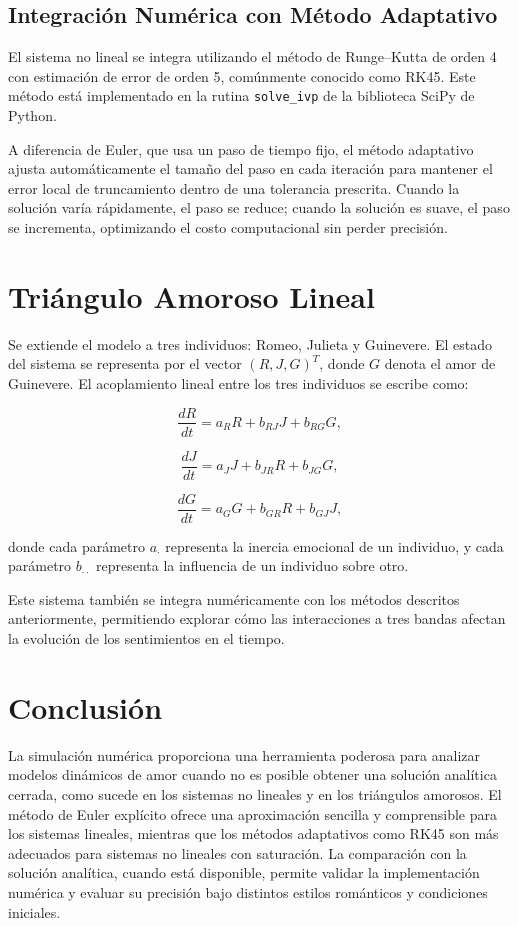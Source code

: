 \documentclass[12pt]{article}
\begin{document}
\subsection{Integración Numérica con Método Adaptativo}

El sistema no lineal se integra utilizando el método de Runge--Kutta de orden 4 con estimación de error de orden 5, comúnmente conocido como RK45. Este método está implementado en la rutina \texttt{solve\_ivp} de la biblioteca SciPy de Python.

A diferencia de Euler, que usa un paso de tiempo fijo, el método adaptativo ajusta automáticamente el tamaño del paso en cada iteración para mantener el error local de truncamiento dentro de una tolerancia prescrita. Cuando la solución varía rápidamente, el paso se reduce; cuando la solución es suave, el paso se incrementa, optimizando el costo computacional sin perder precisión.

\section{Triángulo Amoroso Lineal}

Se extiende el modelo a tres individuos: Romeo, Julieta y Guinevere. El estado del sistema se representa por el vector $(R, J, G)^T$, donde $G$ denota el amor de Guinevere. El acoplamiento lineal entre los tres individuos se escribe como:

\begin{equation}
\frac{dR}{dt} = a_R R + b_{RJ} J + b_{RG} G,
\end{equation}

\begin{equation}
\frac{dJ}{dt} = a_J J + b_{JR} R + b_{JG} G,
\end{equation}

\begin{equation}
\frac{dG}{dt} = a_G G + b_{GR} R + b_{GJ} J,
\end{equation}

donde cada parámetro $a_\cdot$ representa la inercia emocional de un individuo, y cada parámetro $b_{\cdot\cdot}$ representa la influencia de un individuo sobre otro.

Este sistema también se integra numéricamente con los métodos descritos anteriormente, permitiendo explorar cómo las interacciones a tres bandas afectan la evolución de los sentimientos en el tiempo.

\section{Conclusión}

La simulación numérica proporciona una herramienta poderosa para analizar modelos dinámicos de amor cuando no es posible obtener una solución analítica cerrada, como sucede en los sistemas no lineales y en los triángulos amorosos. El método de Euler explícito ofrece una aproximación sencilla y comprensible para los sistemas lineales, mientras que los métodos adaptativos como RK45 son más adecuados para sistemas no lineales con saturación. La comparación con la solución analítica, cuando está disponible, permite validar la implementación numérica y evaluar su precisión bajo distintos estilos románticos y condiciones iniciales.
\end{document}

